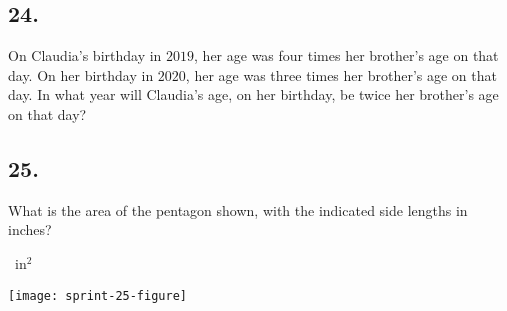 \documentclass[12pt]{article}
\begin{document}
\subsection*{24.}
On Claudia's birthday in $2019$, her age was four times her brother's age on that day. On her birthday in $2020$, her age was three times her brother's age on that day. In what year will Claudia's age, on her birthday, be twice her brother's age on that day?

\nopagebreak

\fbox{\phantom{ANSWER}}

\begin{answer}
%
\end{answer}


\subsection*{25.}
What is the area of the pentagon shown, with the indicated side lengths in inches? 

\nopagebreak

\fbox{\phantom{ANSWER}}~in$^2$

\begin{minipagex}[b]{\linewidth}
\centering
\texttt{[image: sprint-25-figure]}
\end{minipagex}
\end{document}
